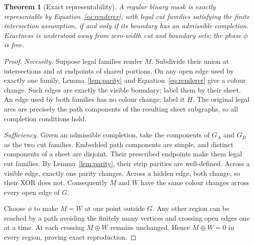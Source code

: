 \documentclass[11pt,a4paper]{article}
\newtheorem{theorem}{Theorem}
\theoremstyle{definition}
\newcommand{\xor}{\oplus}
\begin{document}
\begin{theorem}[Exact representability]\label{thm:main}
A regular binary mask is exactly representable by
Equation~\eqref{eq:renderer}, with legal cut families satisfying the finite
intersection assumption, if and only if its boundary has an admissible
completion. Exactness is understood away from zero-width cut and boundary
sets; the phase $\phi$ is free.
\end{theorem}
\begin{proof}
\emph{Necessity.} Suppose legal families render $M$. Subdivide their union at
intersections and at endpoints of shared portions. On any open edge used by
exactly one family, Lemma~\ref{lem:parity} and
Equation~\eqref{eq:renderer} give a colour change. Such edges are exactly the
visible boundary; label them by their sheet. An edge used by both families
has no colour change; label it $H$. The original legal arcs are precisely
the path components of the resulting sheet subgraphs, so all completion
conditions hold.

\emph{Sufficiency.} Given an admissible completion, take the components of
$G_A$ and $G_B$ as the two cut families. Embedded path components are simple,
and distinct components of a sheet are disjoint. Their prescribed endpoints
make them legal cut families. By Lemma~\ref{lem:parity}, their strip parities
are well-defined. Across a visible edge, exactly one parity changes. Across
a hidden edge, both change, so their XOR does not. Consequently $M$ and $W$
have the same colour changes across every open edge of $G$.

Choose $\phi$ to make $M=W$ at one point outside $G$. Any other region can be
reached by a path avoiding the finitely many vertices and crossing open edges
one at a time. At each crossing $M\xor W$ remains unchanged. Hence
$M\xor W=0$ in every region, proving exact reproduction.
\end{proof}
\end{document}
